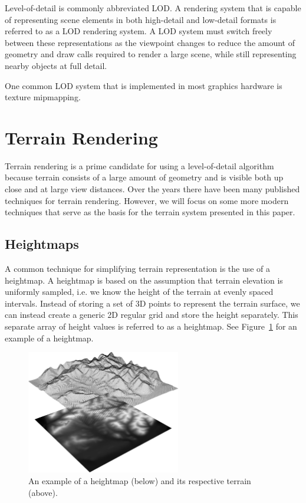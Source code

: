 Level-of-detail is commonly abbreviated LOD.
A rendering system that is capable of representing scene elements in both high-detail and low-detail formats is referred to as a LOD rendering system.
A LOD system must switch freely between these representations as the viewpoint changes to reduce the amount of geometry and draw calls required to render a large scene, while still representing nearby objects at full detail.

One common LOD system that is implemented in most graphics hardware is texture mipmapping. \cite{opengl_mipmaps}


\section{Terrain Rendering} \label{terrain_render}

Terrain rendering is a prime candidate for using a level-of-detail algorithm because terrain consists of a large amount of geometry and is visible both up close and at large view distances.
Over the years there have been many published techniques for terrain rendering.
\cite{hardware_lod}
\cite{roambetter}
\cite{bruneton_terrain}
\cite{p-bdam}
\cite{righttri}
\cite{diamondterrain}
\cite{roam}
\cite{clod}
However, we will focus on some more modern techniques that serve as the basis for the terrain system presented in this paper.


\subsection{Heightmaps}

A common technique for simplifying terrain representation is the use of a heightmap.
A heightmap is based on the assumption that terrain elevation is uniformly sampled, i.e. we know the height of the terrain at evenly spaced intervals.
Instead of storing a set of 3D points to represent the terrain surface, we can instead create a generic 2D regular grid and store the height separately.
This separate array of height values is referred to as a heightmap.
See Figure~\ref{fig:hm} for an example of a heightmap.

\begin{figure}
	\centering
		\includegraphics[width=0.6\textwidth]{figures/hm1.png}
	\caption{An example of a heightmap (below) and its respective terrain (above).}
	\label{fig:hm}
\end{figure}

